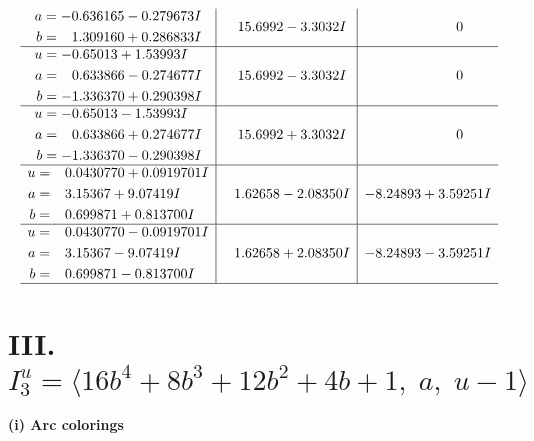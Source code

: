 \documentclass[1p]{elsarticle_modified}
\theoremstyle{definition}
\begin{document}
$$\begin{array}{c|c|c}
\begin{aligned}
a &= -0.636165 - 0.279673 I \\
b &= \phantom{-}1.309160 + 0.286833 I\end{aligned}
 & \phantom{-}15.6992 - 3.3032 I & \phantom{-0.000000 } 0 \\ \hline\begin{aligned}
u &= -0.65013 + 1.53993 I \\
a &= \phantom{-}0.633866 - 0.274677 I \\
b &= -1.336370 + 0.290398 I\end{aligned}
 & \phantom{-}15.6992 - 3.3032 I & \phantom{-0.000000 } 0 \\ \hline\begin{aligned}
u &= -0.65013 - 1.53993 I \\
a &= \phantom{-}0.633866 + 0.274677 I \\
b &= -1.336370 - 0.290398 I\end{aligned}
 & \phantom{-}15.6992 + 3.3032 I & \phantom{-0.000000 } 0 \\ \hline\begin{aligned}
u &= \phantom{-}0.0430770 + 0.0919701 I \\
a &= \phantom{-}3.15367 + 9.07419 I \\
b &= \phantom{-}0.699871 + 0.813700 I\end{aligned}
 & \phantom{-}1.62658 - 2.08350 I & -8.24893 + 3.59251 I \\ \hline\begin{aligned}
u &= \phantom{-}0.0430770 - 0.0919701 I \\
a &= \phantom{-}3.15367 - 9.07419 I \\
b &= \phantom{-}0.699871 - 0.813700 I\end{aligned}
 & \phantom{-}1.62658 + 2.08350 I & -8.24893 - 3.59251 I\\
 \hline 
 \end{array}$$\newpage\newpage\renewcommand{\arraystretch}{1}
\centering \section*{III. $I^u_{3}= \langle 16 b^4+8 b^3+12 b^2+4 b+1,\;a,\;u-1 \rangle$}
\flushleft \textbf{(i) Arc colorings}\\
\end{document}

